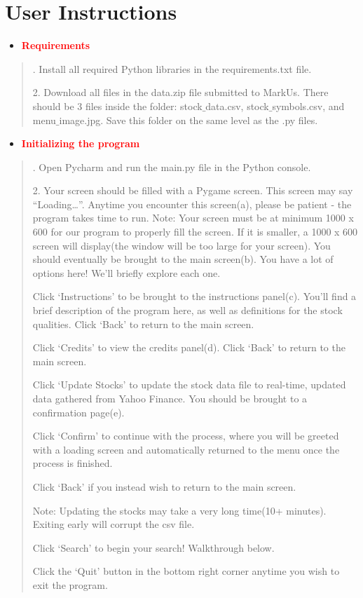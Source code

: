 \documentclass[fontsize=12pt]{article}
\begin{document}
\section*{User Instructions}
\begin{itemize}
\item
\textbf{\textcolor{red}{Requirements}}
\end{itemize}
\begin{quote}
. Install all required Python libraries in the requirements.txt file.

2. Download all files in the data.zip file submitted to MarkUs. There should be 3 files inside the folder: stock$\_$data.csv, stock$\_$symbols.csv, and menu$\_$image.jpg.  Save this folder on the same level as the .py files.
\end{quote}
\begin{itemize}
\item
\textbf{\textcolor{red}{Initializing the program}}
\end{itemize}
\begin{quote}
. Open Pycharm and run the main.py file in the Python console.

2. Your screen should be filled with a Pygame screen. This screen may say “Loading…”. Anytime you encounter this screen(a), please be patient - the program takes time to run.
Note: Your screen must be at minimum 1000 x 600 for our program to properly fill the screen. If it is smaller, a 1000 x 600 screen will display(the window will be too large for your screen).
You should eventually be brought to the main screen(b). You have a lot of options here! We’ll briefly explore each one.

Click ‘Instructions’ to be brought to the instructions panel(c). You’ll find a brief description of the program here, as well as definitions for the stock qualities. Click ‘Back’ to return to the main screen.

Click ‘Credits’ to view the credits panel(d). Click ‘Back’ to return to the main screen.

Click ‘Update Stocks’ to update the stock data file to real-time, updated data gathered from Yahoo Finance. You should be brought to a confirmation page(e). 

Click ‘Confirm’ to continue with the process, where you will be greeted with a loading screen and automatically returned to the menu once the process is finished. 

Click ‘Back’ if you instead wish to return to the main screen.

Note: Updating the stocks may take a very long time(10+ minutes). Exiting early will corrupt the csv file.

Click ‘Search’ to begin your search! Walkthrough below.

Click the ‘Quit’ button in the bottom right corner anytime you wish to exit the program.
\end{quote}
\end{document}
